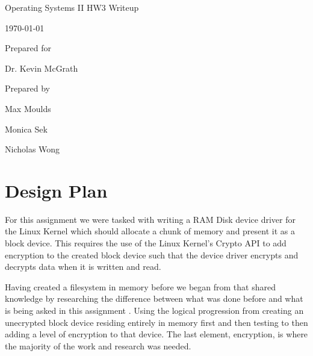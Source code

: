 \documentclass[onecolumn, draftclsnofoot,10pt, compsoc]{IEEEtran}
\def \GroupMemberOne{			Max Moulds}
\def \GroupMemberTwo{			Monica Sek}
\def \GroupMemberThree{			Nicholas Wong}
\def \ProfessorPerson{		Dr. Kevin McGrath}
\def \DocType{		HW3 Writeup
				}
\newcommand{\NameSigPair}[1]{\par
\makebox[2.75in][r]{#1} \hfil 	\makebox[3.25in]{\makebox[2.25in]{\hrulefill} \hfill		\makebox[.75in]{\hrulefill}}
\par\vspace{-12pt} \textit{\tiny\noindent
\makebox[2.75in]{} \hfil		\makebox[3.25in]{\makebox[2.25in][r]{Signature} \hfill	\makebox[.75in][r]{Date}}}}
\begin{document}
\begin{titlepage}
    \begin{singlespace}
        \hfill
        \par\vspace{.2in}
        \centering
        \scshape{
            \huge Operating Systems II \DocType \par
            {\large\today}\par
            \vspace{.5in}
            \vfill
            \vspace{5pt}
						{\large Prepared for }\par
						\ProfessorPerson\par
            {\large Prepared by }\par
            \GroupMemberOne\par
						\GroupMemberTwo\par
						\GroupMemberThree\par
            \vspace{5pt}
            \vspace{20pt}
        }
        \begin{abstract}
       		This document is the writeup for homework 3 of Operating Systems II Spring term 2018, written by Group 20.
					\end{abstract}
    \end{singlespace}
\end{titlepage}
\newpage
{}
\tableofcontents
\clearpage

\section{Design Plan}
For this assignment we were tasked with writing a RAM Disk device driver for the Linux Kernel which should allocate a chunk of memory and present it as a block device. This requires the use of the Linux Kernel's Crypto API to add encryption to the created block device such that the device driver encrypts and decrypts data when it is written and read.

Having created a filesystem in memory before we began from that shared knowledge by researching the difference between what was done before and what is being asked in this assignment \cite{jamescoyle}. Using the logical progression from creating an unecrypted block device residing entirely in memory first and then testing to then adding a level of encryption to that device. The last element, encryption, is where the majority of the work and research was needed. 
\end{document}
